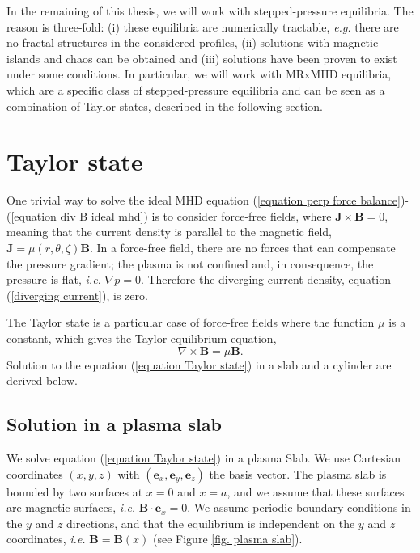 \documentclass[my_thesis.tex]{subfiles}
\begin{document}
In the remaining of this thesis, we will work with stepped-pressure equilibria. The reason is three-fold: (i) these equilibria are numerically tractable, \textit{e.g.} there are no fractal structures in the considered profiles, (ii) solutions with magnetic islands and chaos can be obtained and (iii) solutions have been proven to exist under some conditions. In particular, we will work with \ac{MRxMHD} equilibria, which are a specific class of stepped-pressure equilibria and can be seen as a combination of Taylor states, described in the following section.



\section{Taylor state}
\label{section taylor state}
One trivial way to solve the ideal MHD equation (\ref{equation perp force balance})-(\ref{equation div B ideal mhd}) is to consider force-free fields, where $\mathbf{J}\times\mathbf{B}=0$, meaning that the current density is parallel to the magnetic field, $\mathbf{J}=\mu(r,\theta,\zeta)\mathbf{B}$. In a force-free field, there are no forces that can compensate the pressure gradient; the plasma is not confined and, in consequence, the pressure is flat, \textit{i.e.} $\nabla p=0$. Therefore the diverging current density, equation (\ref{diverging current}), is zero. 

The Taylor state \citep{Taylor1974,Taylor1986} is a particular case of force-free fields where the function $\mu$ is a constant, which gives the Taylor equilibrium equation,
\begin{equation}
	\nabla\times\mathbf{B}=\mu\mathbf{B}. \label{equation Taylor state}
\end{equation}
Solution to the equation (\ref{equation Taylor state}) in a slab and a cylinder are derived below.

\subsection{Solution in a plasma slab}
We solve equation (\ref{equation Taylor state}) in a plasma Slab. We use Cartesian coordinates $(x,y,z)$ with $(\mathbf{e}_x,\mathbf{e}_y,\mathbf{e}_z)$ the basis vector. The plasma slab is bounded by two surfaces at $x=0$ and $x=a$, and we assume that these surfaces are magnetic surfaces, \textit{i.e.} $\mathbf{B}\cdot\mathbf{e}_x=0$. We assume periodic boundary conditions in the $y$ and $z$ directions, and that the equilibrium is independent on the $y$ and $z$ coordinates, \textit{i.e.} $\mathbf{B}=\mathbf{B}(x)$ (see Figure \ref{fig. plasma slab}).
\end{document}
